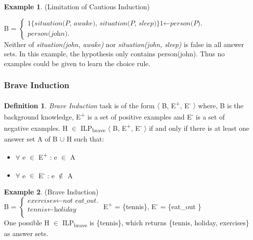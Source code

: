 \documentclass[11pt,twoside]{report}
\theoremstyle{plain}
\theoremstyle{definition}
\newtheorem{defn}[thm]{Definition} %
\newtheorem{examp}{Example}[section]
\begin{document}
\begin{examp} \normalfont (Limitation of Cautious Induction) \\
\label{limitation_cautious}

B = $\begin{cases}
	\textit{1\{situation(P, awake), situation(P, sleep)\}1} \leftarrow \textit{person(P).} \\
	\textit{person(john).}
      \end{cases}$ \\

Neither of \textit{situation(john, awake)} nor \textit{situation(john, sleep)} is false in all answer sets. 
In this example, the hypothesis only contains person(john). Thus no examples could be given to learn the choice rule.
\end{examp}

\subsubsection{Brave Induction}
\begin{defn} \label{def:brave_induction}
\textit{Brave Induction} task is of the form $\langle$ B, E\textsuperscript{+}, E\textsuperscript{-} $\rangle$ where, B is the background knowledge, E\textsuperscript{+} is a set of positive examples and E\textsuperscript{-} is a set of negative examples.
 H $\in$ ILP\textsubscript{brave} $\langle$ B, E\textsuperscript{+}, E\textsuperscript{-} $\rangle$ if and only if there is at least one answer set A of B $\cup$ H such that:
\begin{itemize}
\item $\forall$ e $\in$ E\textsuperscript{+} : e $\in$ A
\item $\forall$ e $\in$ E\textsuperscript{-} : e $\notin$ A
\end{itemize}
\end{defn}

\begin{examp} \normalfont (Brave Induction) \\

B = $\begin{cases}
	\textit{exercises}  \leftarrow \textit{not \ eat\_out.} \\
	\textit{tennis} \leftarrow \textit{holiday} \\
      \end{cases}$
E\textsuperscript{+} = \{tennis\},   E\textsuperscript{-} = \{eat\_out \} \\

One possible  H $\in$ ILP\textsubscript{brave} is \{tennis\}, which returns \{tennis, holiday, exercises\} as answer sets.
\end{examp}
\label{brave_induction_example}
\end{document}
